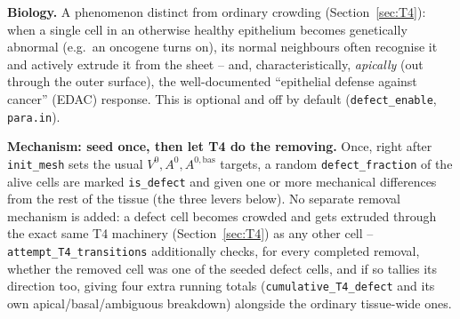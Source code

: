 \documentclass[11pt,a4paper]{report}
\begin{document}
\textbf{Biology.} A phenomenon distinct from ordinary crowding
(Section~\ref{sec:T4}): when a single cell in an otherwise healthy
epithelium becomes genetically abnormal (e.g.\ an oncogene turns on),
its normal neighbours often recognise it and actively extrude it from
the sheet -- and, characteristically, \emph{apically} (out through the
outer surface), the well-documented ``epithelial defense against
cancer'' (EDAC) response. This is optional and off by default
(\texttt{defect\_enable}, \texttt{para.in}).

\textbf{Mechanism: seed once, then let T4 do the removing.} Once,
right after \texttt{init\_mesh} sets the usual
$V^0,A^0,A^{0,\mathrm{bas}}$ targets, a random
\texttt{defect\_fraction} of the alive cells are marked
\texttt{is\_defect} and given one or more mechanical differences from
the rest of the tissue (the three levers below). No separate removal
mechanism is added: a defect cell becomes crowded and gets extruded
through the exact same T4 machinery (Section~\ref{sec:T4}) as any
other cell -- \texttt{attempt\_T4\_transitions} additionally checks,
for every completed removal, whether the removed cell was one of the
seeded defect cells, and if so tallies its direction too, giving four
extra running totals (\texttt{cumulative\_T4\_defect} and its own
apical/basal/ambiguous breakdown) alongside the ordinary tissue-wide
ones.
\end{document}
